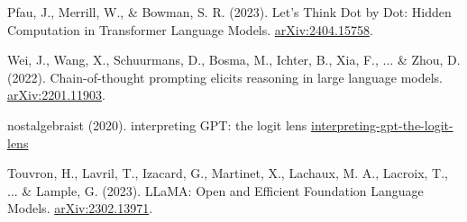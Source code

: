 \documentclass[10pt,a4paper]{article}
\begin{document}
\clearpage

\begin{thebibliography}{9}

Pfau, J., Merrill, W., \& Bowman, S. R. (2023). Let's Think Dot by Dot: Hidden Computation in Transformer Language Models. \href{https://arxiv.org/abs/2404.15758}{arXiv:2404.15758}.

Wei, J., Wang, X., Schuurmans, D., Bosma, M., Ichter, B., Xia, F., ... \& Zhou, D. (2022). Chain-of-thought prompting elicits reasoning in large language models. \href{https://arxiv.org/abs/2201.11903}{arXiv:2201.11903}.

nostalgebraist (2020). interpreting GPT: the logit lens \href{https://www.lesswrong.com/posts/AcKRB8wDpdaN6v6ru/}{interpreting-gpt-the-logit-lens}

Touvron, H., Lavril, T., Izacard, G., Martinet, X., Lachaux, M. A., Lacroix, T., ... \& Lample, G. (2023). LLaMA: Open and Efficient Foundation Language Models. \href{https://arxiv.org/abs/2302.13971}{arXiv:2302.13971}.

\end{thebibliography}
\end{document}
